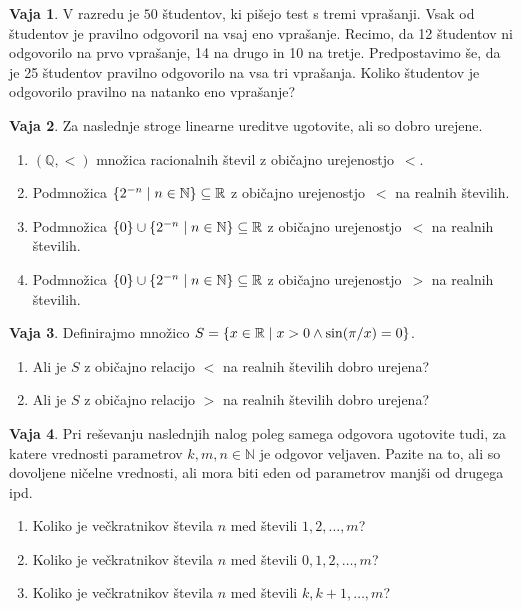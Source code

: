 \documentclass{article}
\newcommand{\NN}{\mathbb{N}}
\newcommand{\QQ}{\mathbb{Q}}
\newcommand{\RR}{\mathbb{R}}
\theoremstyle{definition}
\newtheorem{vaja}{Vaja}
\begin{document}
\begin{vaja}
  V razredu je $50$ študentov, ki pišejo test s tremi vprašanji. Vsak od študentov je pravilno odgovoril na vsaj eno vprašanje. Recimo, da 12 študentov ni odgovorilo na prvo vprašanje, 14 na drugo in 10 na tretje. Predpostavimo še, da je 25 študentov pravilno odgovorilo na vsa tri vprašanja. Koliko študentov je odgovorilo pravilno na natanko eno vprašanje? 
\end{vaja}

\begin{vaja}
  Za naslednje stroge linearne ureditve ugotovite, ali so dobro urejene.
  \begin{enumerate}
    \item
      $(\QQ, <)$ množica racionalnih števil z običajno urejenostjo~$<$.
    \item
      Podmnožica $\set{2^{-n}}{n \in \NN} \subseteq \RR$ z običajno urejenostjo~$<$ na realnih številih.
    \item
      Podmnožica $\set{0} \cup \set{2^{-n}}{n \in \NN} \subseteq \RR$ z običajno urejenostjo~$<$ na realnih številih.
    \item
      Podmnožica $\set{0} \cup \set{2^{-n}}{n \in \NN} \subseteq \RR$ z običajno urejenostjo~$>$ na realnih številih.
  \end{enumerate}
\end{vaja}

\begin{vaja}
  Definirajmo množico $S = \set{x \in \RR}{x > 0 \land \sin(\pi/x) = 0}$.
  \begin{enumerate}
    \item Ali je $S$ z običajno relacijo $<$ na realnih številih dobro urejena?
    \item Ali je $S$ z običajno relacijo $>$ na realnih številih dobro urejena?
  \end{enumerate}
\end{vaja}

\begin{vaja}
  Pri reševanju naslednjih nalog poleg samega odgovora ugotovite tudi, za katere vrednosti parametrov $k, m, n \in \NN$ je odgovor veljaven. Pazite na to, ali so dovoljene ničelne vrednosti, ali mora biti eden od parametrov manjši od drugega ipd.
  \begin{enumerate}
    \item
      Koliko je večkratnikov števila $n$ med števili $1, 2, \ldots, m$?
    \item
      Koliko je večkratnikov števila $n$ med števili $0, 1, 2, \ldots, m$?
    \item
      Koliko je večkratnikov števila $n$ med števili $k, k+1, \ldots, m$?
  \end{enumerate}
\end{vaja}
\end{document}
